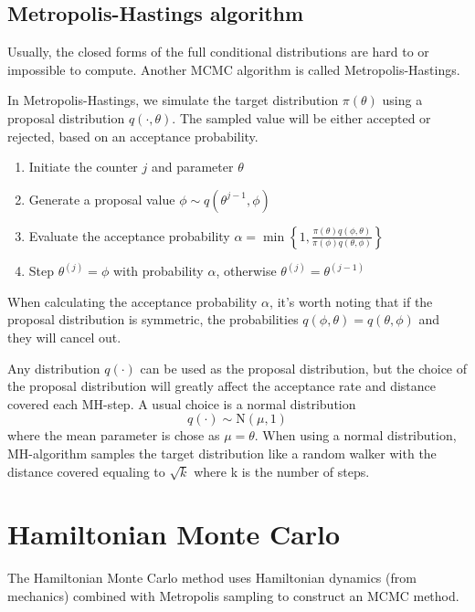 \documentclass[letterpaper, 12pt]{article}
\newcommand{\myexample}[2]{
    \begin{tcolorbox}[colback=black!5!white,colframe=black,title={Example: #1},
    before skip=12pt]
        #2
    \end{tcolorbox}
}
\newcommand{\1}{\mathds{1}} %
\theoremstyle{definition}
\begin{document}
\subsection{Metropolis-Hastings algorithm}
Usually, the closed forms of the full conditional distributions are hard to or impossible to compute. Another MCMC algorithm is called Metropolis-Hastings.

In Metropolis-Hastings, we simulate the target distribution $\pi(\theta)$ using a proposal distribution $q(\cdot, \theta)$. The sampled value will be either accepted or rejected, based on an acceptance probability.

\myexample{The Metropolis-Hastings algorithm}{
\begin{enumerate}[itemsep=-1pt]
  \item Initiate the counter $j$ and parameter $\theta$
  \item Generate a proposal value $\phi \sim q(\theta^{j-1}, \phi)$
  \item Evaluate the acceptance probability $\alpha = \min\left\{ 1, \frac{\pi(\theta) q(\phi, \theta)}{\pi(\phi) q(\theta, \phi)} \right\}$
  \item Step $\theta ^{(j)} = \phi$ with probability $\alpha$, otherwise $\theta ^{(j)} = \theta ^{(j-1)}$
\end{enumerate}
}

When calculating the acceptance probability $\alpha$, it's worth noting that if the proposal distribution is symmetric, the probabilities $q(\phi, \theta) = q(\theta, \phi)$ and they will cancel out.

Any distribution $q(\cdot)$ can be used as the proposal distribution, but the choice of the proposal distribution will greatly affect the acceptance rate and distance covered each MH-step. A usual choice is a normal distribution
\[
  q(\cdot) \sim \mathrm{N}(\mu, 1)\] where the mean parameter is chose as $\mu = \theta$. When using a normal distribution, MH-algorithm samples the target distribution like a random walker with the distance covered equaling to $\sqrt{k}$ where k is the number of steps.

\section{Hamiltonian Monte Carlo}

The Hamiltonian Monte Carlo method uses Hamiltonian dynamics (from mechanics) combined with Metropolis sampling to construct an MCMC method.
\end{document}
